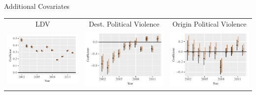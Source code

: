 \documentclass{beamer}
\begin{document}
\begin{frame}{Additional Covariates}
\begin{tabular}{c@{\hskip -.4cm}c@{\hskip -.4cm}c}
\small{LDV} & \small{Dest. Political Violence} & \small{Origin Political Violence} \\ 
\includegraphics[height=.3\textheight, clip=true, trim=.5cm .5cm 0cm .1cm]{slides_figures/rl_plots/LDV.pdf} 
 &
\includegraphics[height=.3\textheight, clip=true, trim=.5cm .5cm 0cm .1cm]{slides_figures/rl_plots/DestPV.pdf}   &
\includegraphics[height=.3\textheight, clip=true, trim=.5cm .5cm 0cm .1cm]{slides_figures/rl_plots/OriginPV.pdf} \\  
\end{tabular}

\end{frame}
\end{document}
